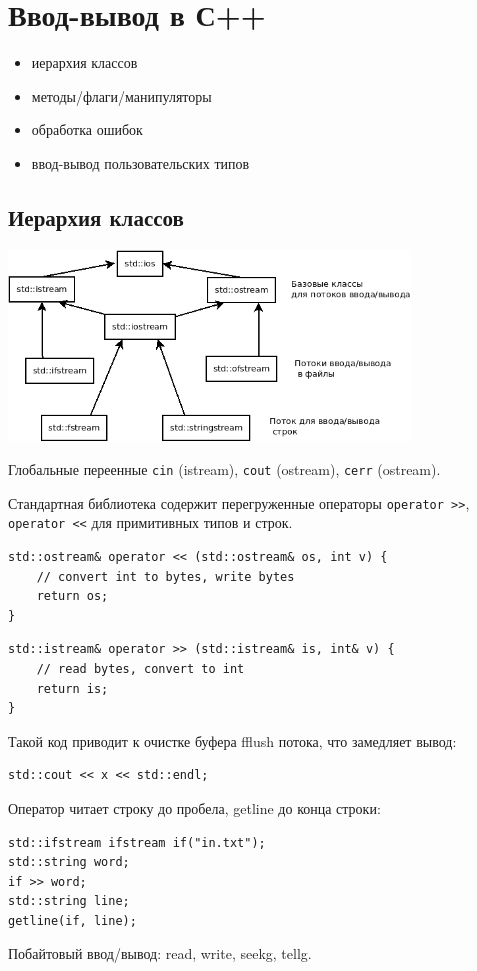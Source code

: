 \section{Ввод-вывод в С++}
\begin{itemize}[noitemsep]
    \item иерархия классов
    \item методы/флаги/манипуляторы
    \item обработка ошибок
    \item ввод-вывод пользовательских типов
\end{itemize}

\subsection{Иерархия классов}

\begin{center}
  \includegraphics[width=0.8\textwidth]{io_classes.png}
\end{center}

Глобальные переенные \texttt{cin} (istream), \texttt{cout} (ostream), \texttt{cerr} (ostream).

Стандартная библиотека содержит перегруженные операторы \texttt{operator >>}, \texttt{operator <<} для примитивных типов и строк. 

\begin{verbatim}
std::ostream& operator << (std::ostream& os, int v) {
    // convert int to bytes, write bytes
    return os;
}
\end{verbatim}
\begin{verbatim}
std::istream& operator >> (std::istream& is, int& v) {
    // read bytes, convert to int
    return is;
}
\end{verbatim}
Такой код приводит к очистке буфера fflush потока, что замедляет вывод:
\begin{verbatim}
std::cout << x << std::endl;
\end{verbatim}
Оператор читает строку до пробела, getline до конца строки:
\begin{verbatim}
std::ifstream ifstream if("in.txt");
std::string word;
if >> word;
std::string line;
getline(if, line);
\end{verbatim}
Побайтовый ввод/вывод: read, write, seekg, tellg.

